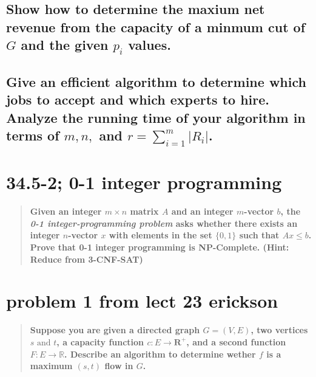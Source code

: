 \documentclass[titlepage]{article}\usepackage[]{graphicx}\usepackage[]{color}
\begin{document}
\subsection{ Show how to determine the maxium net revenue from the capacity of
a minmum cut of $G$ and the given $p_i$ values.}
\vspace{8cm}


\subsection{ Give an efficient algorithm to determine which jobs to accept and
  which experts to hire. Analyze the running time of your algorithm in terms
  of $m,n,$ and $r = \sum_{i = 1}^m | R_i|$.}
  \newpage



  \section{34.5-2; 0-1 integer programming}
  \begin{quote}
    \textbf{Given an integer $m \times n$ matrix $A$ and an integer $m$-vector
    $b$, the \emph{0-1 integer-programming problem} asks whether there exists
    an integer $n$-vector $x$ with elements in the set $\{ 0, 1\}$ such that
    $Ax \leq b$. Prove that 0-1 integer programming is NP-Complete. (Hint:
  Reduce from 3-CNF-SAT)}
  \end{quote}
  \vspace{8cm}



  \section{problem 1 from lect 23 erickson}
  \begin{quote}
    \textbf{Suppose you are given a directed graph $G = (V,E)$, two vertices
      $s \text { and } t$, a capacity function $c:E \to \mathbf{R}^+$, and a second
      function $F:E \to \mathbb{R}$. Describe an algorithm to determine wether $f$ is a
    maximum $(s,t)$ flow in $G$.}
  \end{quote}

  \newpage
\end{document}
